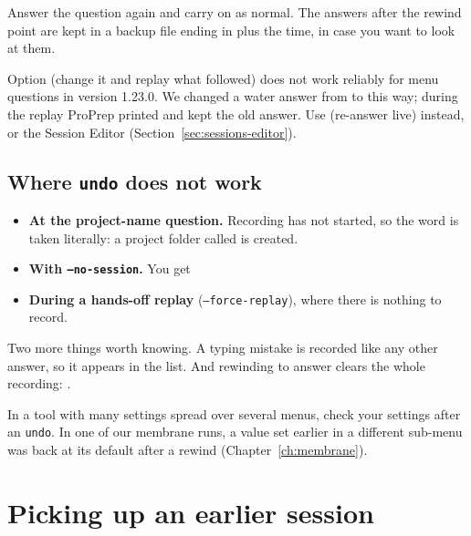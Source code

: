 Answer the question again and carry on as normal. The answers after the
rewind point are kept in a backup file ending in  plus the time,
in case you want to look at them.

\begin{watchout}
Option  (\textsf{change it and replay what followed}) does not work
reliably for menu questions in version 1.23.0. We changed a water answer from
 to  this way; during the replay ProPrep printed
 and kept the old answer. Use  (re-answer live) instead, or
the Session Editor (Section~\ref{sec:sessions-editor}).
\end{watchout}

\subsection{Where \texttt{undo} does not work}

\begin{itemize}
  \item \textbf{At the project-name question.} Recording has not started, so
        the word is taken literally: a project folder called  is
        created.
  \item \textbf{With \texttt{--no-session}.} You get
  \item \textbf{During a hands-off replay} (\texttt{--force-replay}), where
        there is nothing to record.
\end{itemize}

Two more things worth knowing. A typing mistake is recorded like any other
answer, so it appears in the list. And rewinding to answer  clears
the whole recording: .

\begin{watchout}
In a tool with many settings spread over several menus, check your settings
after an \texttt{undo}. In one of our membrane runs, a value set earlier in a
different sub-menu was back at its default after a rewind
(Chapter~\ref{ch:membrane}).
\end{watchout}

\section{Picking up an earlier session}
\label{sec:sessions-resume}

